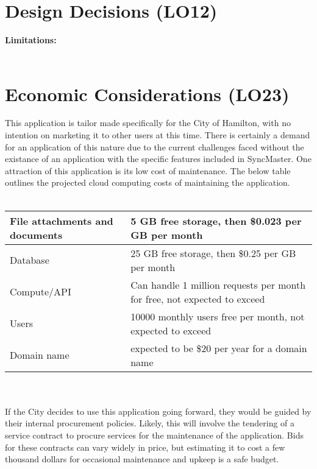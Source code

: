 \documentclass{article}
\begin{document}
\section{Design Decisions (LO12)}

\textbf{Limitations:}\\
\\
\section{Economic Considerations (LO23)}


This application is tailor made specifically for the City of Hamilton, with no intention on marketing it to
other users at this time. There is certainly a demand for an application of this nature due to 
the current challenges faced without the existance of an application with the specific features
included in SyncMaster. One attraction of this application is its low cost of maintenance. The below table outlines the projected
cloud computing costs of maintaining the application.\\
\\
\begin{tabular}{|m{5cm}|m{5cm}|}
  \hline
  File attachments and documents & 5 GB free storage, then \$0.023 per GB per month\\
  \hline
  Database & 25 GB free storage, then \$0.25 per GB per month\\
  \hline
  Compute/API & Can handle 1 million requests per month for free, not expected to exceed\\
  \hline
  Users & 10000 monthly users free per month, not expected to exceed\\
  \hline
  Domain name & expected to be \$20 per year for a domain name\\
  \hline
\end{tabular}
\\
\\
If the City decides to use this application going forward, they would be guided by their internal procurement policies. Likely, this will involve the
tendering of a service contract to procure services for the maintenance of the application. Bids for these contracts can vary 
widely in price, but estimating it to cost a few thousand dollars for occasional maintenance and upkeep is a safe budget.
\end{document}
